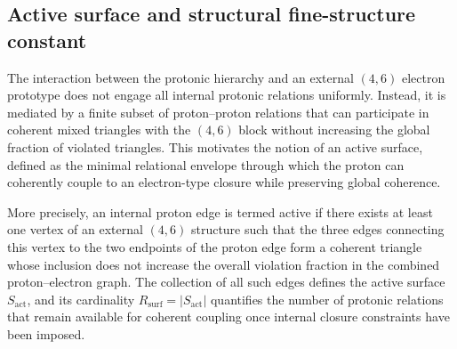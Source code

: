 \documentclass[11pt,a4paper]{article}
\begin{document}
\subsection{Active surface and structural fine-structure constant}
The interaction between the protonic hierarchy and an external $(4,6)$ electron prototype does not engage all internal protonic relations uniformly. Instead, it is mediated by a finite subset of proton–proton relations that can participate in coherent mixed triangles with the $(4,6)$ block without increasing the global fraction of violated triangles.\cite{LaubscherDerivationAlpha2026,LaubscherGoldenRatioPDL2026} This motivates the notion of an active surface, defined as the minimal relational envelope through which the proton can coherently couple to an electron-type closure while preserving global coherence.

More precisely, an internal proton edge is termed active if there exists at least one vertex of an external $(4,6)$ structure such that the three edges connecting this vertex to the two endpoints of the proton edge form a coherent triangle whose inclusion does not increase the overall violation fraction in the combined proton–electron graph.\cite{LaubscherDerivationAlpha2026} The collection of all such edges defines the active surface $S_{\mathrm{act}}$, and its cardinality $R_{\mathrm{surf}}=|S_{\mathrm{act}}|$ quantifies the number of protonic relations that remain available for coherent coupling once internal closure constraints have been imposed.
\end{document}
